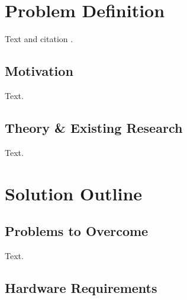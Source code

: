 \documentclass[a4paper, 12pt, english]{article}
\begin{document}

    \fullPageTitle

    \thispagestyle{noheader}
    \tableofcontents

    \vspace{2em}
    \listoffigures

    \vspace{2em}
    \listoftables

    \newpage

    \section{Problem Definition}
        \label{sec: Problem Definition}
        
        Text and citation \cite{bibtex-reference-types}.
    

        \subsection{Motivation}
            \label{subsec: motivation}

            Text.


        \subsection{Theory \& Existing Research}
            \label{subsec: theory and existing research}

            Text.

    
    \section{Solution Outline}
        \label{sec: Solution Outline}

        \subsection{Problems to Overcome}
            \label{subsec: Problems to Overcome}

            Text.

            
        \subsection{Hardware Requirements}
            \label{subsec: Hardware Requirements}
\end{document}

